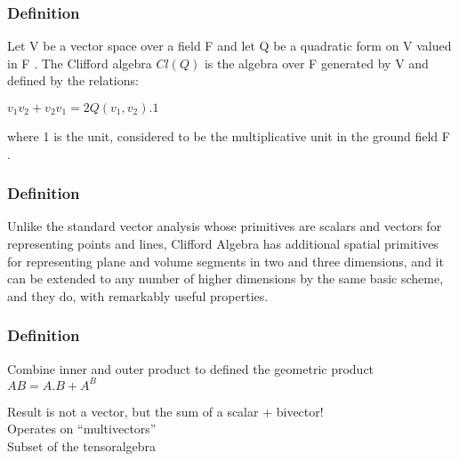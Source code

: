 \label{definition}
\begin{frame}\frametitle{Definition}
  \begin{definition}
 Let V be a vector space over a field F and let Q be a quadratic form on V
valued in F . The Clifford algebra $Cl(Q)$ is the algebra over F generated by V and defined
by the relations:
\begin{center}
$v_{1} v_{2} + v_{2}v_{1} = 2Q(v_{1} , v_{2} ) . 1$
 
\end{center}

where 1 is the unit, considered to be the multiplicative unit in the ground field F .
  \end{definition}
  
 \end{frame} 
  
  
  
  
\begin{frame}\frametitle{Definition} 
  Unlike the standard vector analysis whose primitives are scalars and vectors for representing points and lines, Clifford Algebra has additional spatial primitives for representing plane and volume segments in two and three dimensions, and it can be extended to any number of higher dimensions by the same basic scheme, and they do, with remarkably useful properties.
  
 
  
  
  
\end{frame}
  
  
  
  
  
  
  
  
 \begin{frame}\frametitle{Definition} 

Combine inner and outer product to defined the geometric product \\
	$AB = A.B + A^B$


Result is not a vector, but the sum of a scalar + bivector!\\
Operates on “multivectors”\\
Subset of the tensoralgebra 
 
\end{frame}


